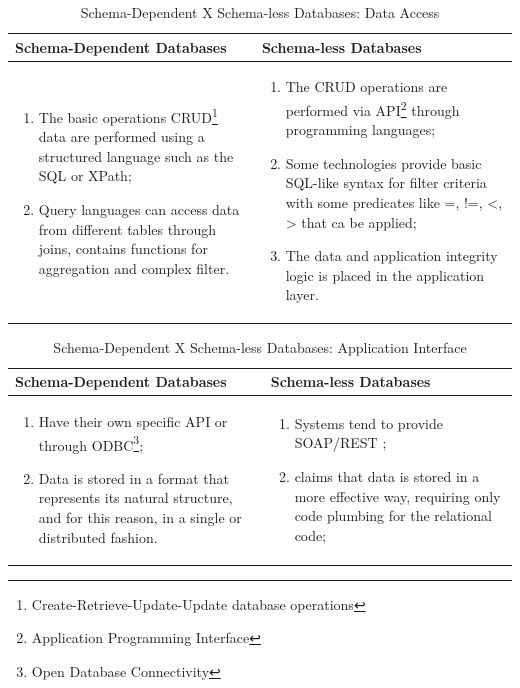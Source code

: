 \begin{table}
    \label{tab:ysi-data-distribution}
    \caption{Schema-Dependent X Schema-less Databases: Data Access}
    \begin{center}
    \begin{tabular}{|p{210pt}|p{210pt}|}\hline
    Schema-Dependent Databases & Schema-less Databases\\\hline
    \begin{enumerate}
      \item The basic operations CRUD\footnote{Create-Retrieve-Update-Update
      database operations} data are performed using a structured language such
      as the SQL or XPath;
      \item Query languages can access data from different tables through
      joins, contains functions for aggregation and complex filter.
    \end{enumerate} 
    & 
    \begin{enumerate}
      \item The CRUD operations are performed via API\footnote{Application
      Programming Interface} through programming languages;
      \item Some technologies provide basic SQL-like syntax for filter criteria
      with some predicates like =, !=, <, > that ca be applied;
      \item The data and application integrity logic is placed in the
      application layer.
    \end{enumerate}
    \\\hline
    \end{tabular}
    \end{center}
\end{table}

\begin{table}
    \label{tab:ysi-data-distribution}
    \caption{Schema-Dependent X Schema-less Databases: Application Interface}
    \begin{center}
    \begin{tabular}{|p{210pt}|p{210pt}|}\hline
    Schema-Dependent Databases & Schema-less Databases\\\hline
    \begin{enumerate}
      \item Have their own specific API or through ODBC\footnote{Open Database
      Connectivity};
      \item Data is stored in a format that represents its natural structure,
      and for this reason, in a single or distributed fashion.
    \end{enumerate} 
    & 
    \begin{enumerate}
      \item Systems tend to provide SOAP/REST \cite{http-rest};
      \item \cite{db-is-rdbs-dommed} claims that data is stored in a more
      effective way, requiring only code plumbing for the relational code;
    \end{enumerate}
    \\\hline
    \end{tabular}
    \end{center}
\end{table}

